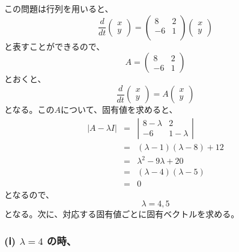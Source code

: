 \documentclass[dvipdfmx,uplatex]{jsarticle}
\begin{document}
\begin{spacing}{1.6}
\begin{qparts}
  この問題は行列を用いると、
  \[
  \frac{d}{dt}
  \left(
  \begin{array}{ccc}
    x \\
    y
  \end{array}
  \right)
  = \left(
    \begin{array}{ccc}
      8 & 2 \\
      -6 & 1 \\
    \end{array}
  \right)
  \left(
  \begin{array}{ccc}
    x \\
    y
  \end{array}
  \right)
  \]
  と表すことができるので、
  \begin{equation*}
    A = \left(
        \begin{array}{ccc}
          8 & 2 \\
          -6 & 1
        \end{array}
      \right)
  \end{equation*}
  とおくと、
  \[
  \frac{d}{dt}
  \left(
  \begin{array}{ccc}
    x \\
    y
  \end{array}
  \right)
  = A
  \left(
  \begin{array}{ccc}
    x \\
    y
  \end{array}
  \right)
  \]
  となる。この$A$について、固有値を求めると、
  \begin{eqnarray*}
    |A - \lambda I| & = & \left|
        \begin{array}{ccc}
          8 - \lambda & 2 \\
          -6 & 1 - \lambda
        \end{array}
      \right| \\
       & = & (\lambda - 1)(\lambda - 8) + 12 \\
       & = & \lambda ^ 2 - 9 \lambda + 20 \\
       & = & (\lambda - 4)(\lambda - 5) \\
       & = & 0
  \end{eqnarray*}
  となるので、
  \begin{equation*}
    \lambda = 4, 5
  \end{equation*}
  となる。次に、対応する固有値ごとに固有ベクトルを求める。\\

  \subsubsection*{(ⅰ) $ \lambda = 4 $ の時、}


\end{qparts}
\end{spacing}
\end{document}

